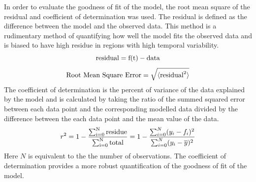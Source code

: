 \documentclass[draft,linenumbers]{agujournal2018}
\begin{document}
In order to evaluate the goodness of fit of the model, the root mean square of the residual and coefficient of determination was used. The residual is defined as the difference between the model and the observed data. This method is a rudimentary method of quantifying how well the model fits the observed data and is biased to have high residue in regions with high temporal variability.
\begin{equation}
    \mbox{\rm residual} = \mbox{\rm f(t)} - \mbox{\rm data} 
\end{equation}
\begin{equation}
    \mbox{\rm Root Mean Square Error} = \sqrt{\langle \mbox{\rm residual}^2\rangle} 
\end{equation}
The coefficient of determination is the percent of variance of the data explained by the model and is calculated by taking the ratio of the summed squared error between each data point and the corresponding modelled data divided by the difference between the each data point and the mean value of the data.
\begin{equation}
 r^{2} = 1 - \frac{\rm \sum_{i=0}^{N} residue}{\rm \sum_{i=0}^{N} total} = 1- \frac{\sum_{i=0}^{N} (y_i - f_i)^2}{\sum_{i=0}^{N} (y_i - \overline{y})^2}
 \end{equation}
Here $N$ is equivalent to the the number of observations. The coefficient of determination provides a more robust quantification of the goodness of fit of the model. 
\end{document}

